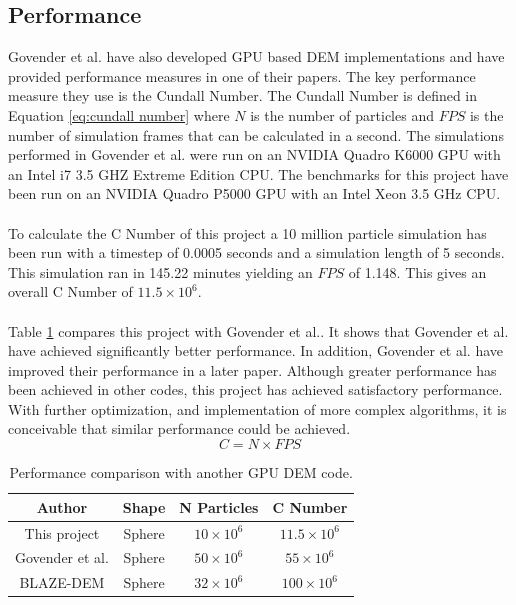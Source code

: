 \documentclass[a4paper,11pt,titlepage]{report}
\begin{document}
\subsection{Performance}
Govender et al. have also developed GPU based DEM implementations and have provided performance measures in one of their papers\cite{performance}. The key performance measure they use is the Cundall Number. The Cundall Number is defined in Equation \ref{eq:cundall number} where $N$ is the number of particles and $FPS$ is the number of simulation frames that can be calculated in a second. The simulations performed in Govender et al.\cite{performance} were run on an NVIDIA Quadro K6000 GPU with an Intel i7 3.5 GHZ Extreme Edition CPU. The benchmarks for this project have been run on an NVIDIA Quadro P5000 GPU with an  Intel Xeon 3.5 GHz CPU.
\\\\To calculate the C Number of this project a 10 million particle simulation has been run with a timestep of 0.0005 seconds and a simulation length of 5 seconds. This simulation ran in 145.22 minutes yielding an $FPS$ of 1.148. This gives an overall C Number of $11.5 \times 10^6$.
\\\\Table \ref{tab:performance comparison} compares this project with Govender et al.\cite{performance}. It shows that Govender et al. have achieved significantly better performance. In addition, Govender et al. have improved their performance in a later paper\cite{blazedem}. Although greater performance has been achieved in other codes, this project has achieved satisfactory performance. With further optimization, and implementation of more complex algorithms, it is conceivable that similar performance could be achieved.
\begin{equation}
C = N \times FPS
\label{eq:cundall number}
\end{equation}
\begin{table}[!ht]
\begin{center}
\begin{tabular}{|c c c c|}
\hline
Author & Shape & N Particles & C Number\\
\hline
This project & Sphere & $10 \times 10^6$ & $11.5 \times 10^6$ \\
Govender et al.\cite{performance} & Sphere & $50 \times 10^6$ & $55 \times 10^6$ \\
BLAZE-DEM\cite{blazedem} & Sphere & $32 \times 10^6$ & $100 \times 10^6$ \\
\hline
\end{tabular}
\end{center}
\caption{Performance comparison with another GPU DEM code.}
\label{tab:performance comparison}
\end{table}
\end{document}
